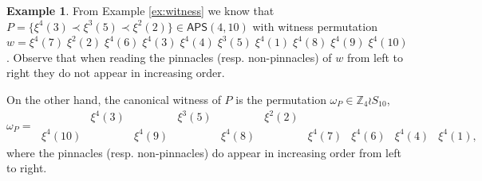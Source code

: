 \documentclass[12pt,reqno]{amsart}
\numberwithin{equation}{section}
\theoremstyle{plain}
\theoremstyle{definition}
\newtheorem{example}[theorem]{Example}
\theoremstyle{remark}
\newcommand{\Z}{\mathbb{Z}}
\newcommand\APS{\mathsf{APS}}
\begin{document}
\begin{example}
From Example \ref{ex:witness} we know that $P = \{\xi^4(3)\prec \xi^3(5)\prec \xi^2(2)\} \in \APS(4,10)$ with witness permutation $w = \xi^4(7)\;\xi^2(2)\;\xi^4(6)\;\xi^4(3)\;\xi^4(4)\;\xi^3(5)\;\xi^4(1)\;\xi^4(8)\; \xi^4(9)\; \xi^4(10)$. Observe that when reading the pinnacles (resp. non-pinnacles) of $w$ from left to right they do not appear in increasing order. 

On the other hand, the canonical witness of $P$ is the permutation $\omega_P \in \Z_4 \wr S_{10}$,
\[\omega_P=\;\begin{matrix}
   &\xi^4(3)&&\xi^3(5)&&\xi^2(2)&
\\
\xi^4(10)&&\xi^4(9)&&\xi^4(8)&&\xi^4(7)& \xi^4(6)& \xi^4(4)& \xi^4(1),
\end{matrix}\]
where the pinnacles (resp. non-pinnacles) do appear in increasing order from left to right.
\end{example}
\end{document}
